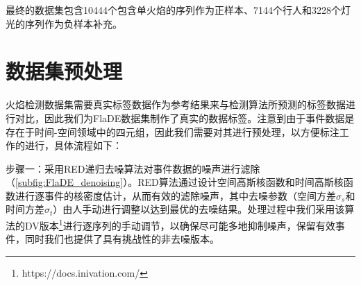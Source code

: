最终的数据集包含10444个包含单火焰的序列作为正样本、7144个行人和3228个灯光的序列作为负样本补充。

\section{数据集预处理}
火焰检测数据集需要真实标签数据作为参考结果来与检测算法所预测的标签数据进行对比，因此我们为FlaDE数据集制作了真实的数据标签。注意到由于事件数据是存在于时间-空间领域中的四元组，因此我们需要对其进行预处理，以方便标注工作的进行，具体流程如下：

步骤一：采用RED递归去噪算法\cite{ding2023}对事件数据的噪声进行滤除（\ref{subfig:FlaDE_denoising}）。RED算法通过设计空间高斯核函数和时间高斯核函数进行逐事件的核密度估计，从而有效的滤除噪声，其中去噪参数（空间方差$\sigma_s$和时间方差$\sigma_t$）由人手动进行调整以达到最优的去噪结果。处理过程中我们采用该算法的DV版本\footnote{https://docs.inivation.com/}进行逐序列的手动调节，以确保尽可能多地抑制噪声，保留有效事件，同时我们也提供了具有挑战性的非去噪版本。

